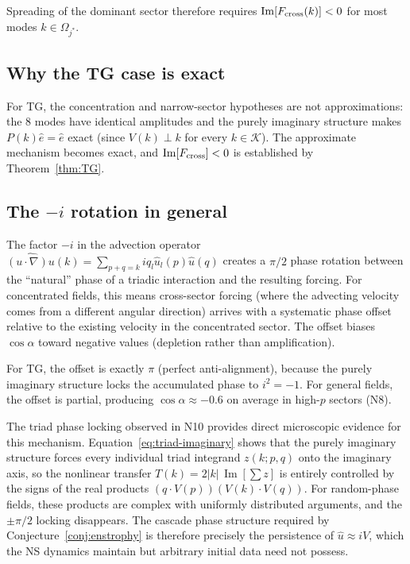\documentclass[11pt]{article}
\theoremstyle{definition}
\newcommand{\cK}{\mathcal{K}}
\DeclareMathOperator{\im}{Im}
\begin{document}
Spreading of the dominant sector therefore requires
$\im[F_{\rm cross}(k)] < 0$ for most modes
$k\in\Omega_{j^*}$.

\subsection{Why the TG case is exact}

For TG, the concentration and narrow-sector hypotheses
are not approximations: the 8 modes have identical
amplitudes and the purely imaginary structure makes
$P(k)\hat e = \hat e$ exact (since $V(k)\perp k$
for every $k\in\cK$).  The approximate mechanism becomes
exact, and $\im[F_{\rm cross}]<0$ is established by
Theorem~\ref{thm:TG}.

\subsection{The $-i$ rotation in general}

The factor $-i$ in the advection operator
$\widehat{(u\cdot\nabla)u}(k) = \sum_{p+q=k}
iq_l\hat u_l(p)\hat u(q)$ creates a $\pi/2$ phase
rotation between the ``natural'' phase of a triadic
interaction and the resulting forcing.  For concentrated
fields, this means cross-sector forcing (where the
advecting velocity comes from a different angular
direction) arrives with a systematic phase offset
relative to the existing velocity in the concentrated
sector.  The offset biases $\cos\alpha$ toward negative
values (depletion rather than amplification).

For TG, the offset is exactly $\pi$ (perfect
anti-alignment), because the purely imaginary structure
locks the accumulated phase to $i^2=-1$.  For general
fields, the offset is partial, producing
$\cos\alpha\approx-0.6$ on average in high-$p$ sectors
(N8).

The triad phase locking observed in N10 provides
direct microscopic evidence for this mechanism.
Equation~\eqref{eq:triad-imaginary} shows that the
purely imaginary structure forces every individual
triad integrand $z(k;p,q)$ onto the imaginary axis,
so the nonlinear transfer $T(k) = 2|k|\,\im[\sum z]$
is entirely controlled by the signs of the real
products $(q\cdot V(p))(V(k)\cdot V(q))$.  For
random-phase fields, these products are complex
with uniformly distributed arguments, and the
$\pm\pi/2$ locking disappears.  The cascade phase
structure required by Conjecture~\ref{conj:enstrophy}
is therefore precisely the persistence of
$\hat u\approx iV$, which the NS dynamics maintain
but arbitrary initial data need not possess.
\end{document}
